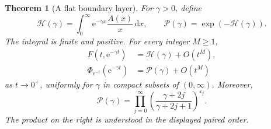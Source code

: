 \documentclass[11pt,oneside]{article}
\numberwithin{equation}{section}
\newtheorem{theorem}{Theorem}[section]
\theoremstyle{definition}
\theoremstyle{remark}
\newcommand{\eps}{\varepsilon}
\newcommand{\dd}{\,\mathrm d}
\newcommand{\e}{\mathrm e}
\begin{document}
\begin{theorem}[A flat boundary layer]
\label{thm:boundarylayer}
For \(\gamma>0\), define
\begin{equation}
 \mathcal H(\gamma)=\int_0^\infty\e^{-\gamma x}\frac{A(x)}x\dd x,
 \qquad \mathcal P(\gamma)=\exp(-\mathcal H(\gamma)).
 \label{eq:Hgamma}
\end{equation}
The integral is finite and positive. For every integer \(M\ge1\),
\begin{align}
 F(t,\e^{-\gamma t})&=\mathcal H(\gamma)+O(t^M),
 \label{eq:boundaryF}\\
 \Phi_{\e^{-t}}(\e^{-\gamma t})&=\mathcal P(\gamma)+O(t^M)
 \label{eq:boundaryPhi}
\end{align}
as \(t\to0^+\), uniformly for \(\gamma\) in compact subsets of
\((0,\infty)\). Moreover,
\begin{equation}
 \mathcal P(\gamma)=
 \prod_{j=0}^{\infty}
      \left(\frac{\gamma+2j}{\gamma+2j+1}\right)^{\eps_j}.
 \label{eq:Pclassical}
\end{equation}
The product on the right is understood in the displayed paired order.
\end{theorem}
\end{document}
